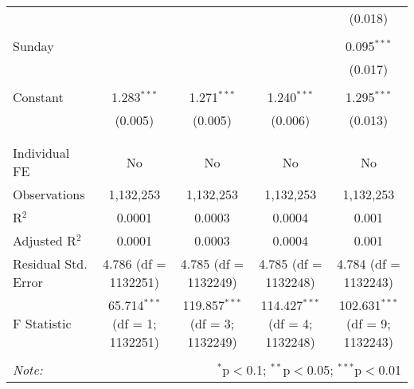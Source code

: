 \documentclass[
]{article}
\begin{document}
\begin{table}[!htbp]
{\begin{tabular}{@{\extracolsep{5pt}}lcccc}
  &  &  &  & (0.018) \\ 
  & & & & \\ 
 Sunday &  &  &  & 0.095$^{***}$ \\ 
  &  &  &  & (0.017) \\ 
  & & & & \\ 
 Constant & 1.283$^{***}$ & 1.271$^{***}$ & 1.240$^{***}$ & 1.295$^{***}$ \\ 
  & (0.005) & (0.005) & (0.006) & (0.013) \\ 
  & & & & \\ 
\hline \\[-1.8ex] 
Individual FE & No & No & No & No \\ 
Observations & 1,132,253 & 1,132,253 & 1,132,253 & 1,132,253 \\ 
R$^{2}$ & 0.0001 & 0.0003 & 0.0004 & 0.001 \\ 
Adjusted R$^{2}$ & 0.0001 & 0.0003 & 0.0004 & 0.001 \\ 
Residual Std. Error & 4.786 (df = 1132251) & 4.785 (df = 1132249) & 4.785 (df = 1132248) & 4.784 (df = 1132243) \\ 
F Statistic & 65.714$^{***}$ (df = 1; 1132251) & 119.857$^{***}$ (df = 3; 1132249) & 114.427$^{***}$ (df = 4; 1132248) & 102.631$^{***}$ (df = 9; 1132243) \\ 
\hline 
\hline \\[-1.8ex] 
\textit{Note:}  & \multicolumn{4}{r}{$^{*}$p$<$0.1; $^{**}$p$<$0.05; $^{***}$p$<$0.01} \\ 
\end{tabular}
} 
\end{table} 
\newpage
\end{document}
